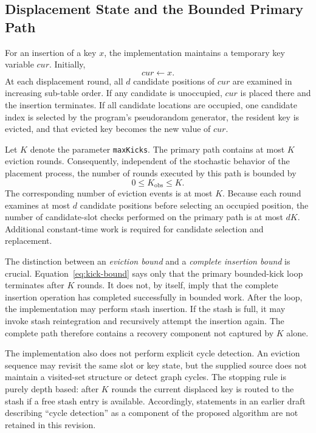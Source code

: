 \documentclass[conference]{IEEEtran}
\begin{document}
\subsection{Displacement State and the Bounded Primary Path}

For an insertion of a key $x$, the implementation maintains a temporary key variable $cur$. Initially,
\[
    cur \leftarrow x.
\]
At each displacement round, all $d$ candidate positions of $cur$ are examined in increasing sub-table order. If any candidate is unoccupied, $cur$ is placed there and the insertion terminates. If all candidate locations are occupied, one candidate index is selected by the program's pseudorandom generator, the resident key is evicted, and that evicted key becomes the new value of $cur$.

Let $K$ denote the parameter \texttt{maxKicks}. The primary path contains at most $K$ eviction rounds. Consequently, independent of the stochastic behavior of the placement process, the number of rounds executed by this path is bounded by
\begin{equation}
    0\le K_{\mathrm{obs}}\le K.
    \label{eq:kick-bound}
\end{equation}
The corresponding number of eviction events is at most $K$. Because each round examines at most $d$ candidate positions before selecting an occupied position, the number of candidate-slot checks performed on the primary path is at most $dK$. Additional constant-time work is required for candidate selection and replacement.

The distinction between an \emph{eviction bound} and a \emph{complete insertion bound} is crucial. Equation~\eqref{eq:kick-bound} says only that the primary bounded-kick loop terminates after $K$ rounds. It does not, by itself, imply that the complete insertion operation has completed successfully in bounded work. After the loop, the implementation may perform stash insertion. If the stash is full, it may invoke stash reintegration and recursively attempt the insertion again. The complete path therefore contains a recovery component not captured by $K$ alone.

The implementation also does not perform explicit cycle detection. An eviction sequence may revisit the same slot or key state, but the supplied source does not maintain a visited-set structure or detect graph cycles. The stopping rule is purely depth based: after $K$ rounds the current displaced key is routed to the stash if a free stash entry is available. Accordingly, statements in an earlier draft describing ``cycle detection'' as a component of the proposed algorithm are not retained in this revision.
\end{document}
